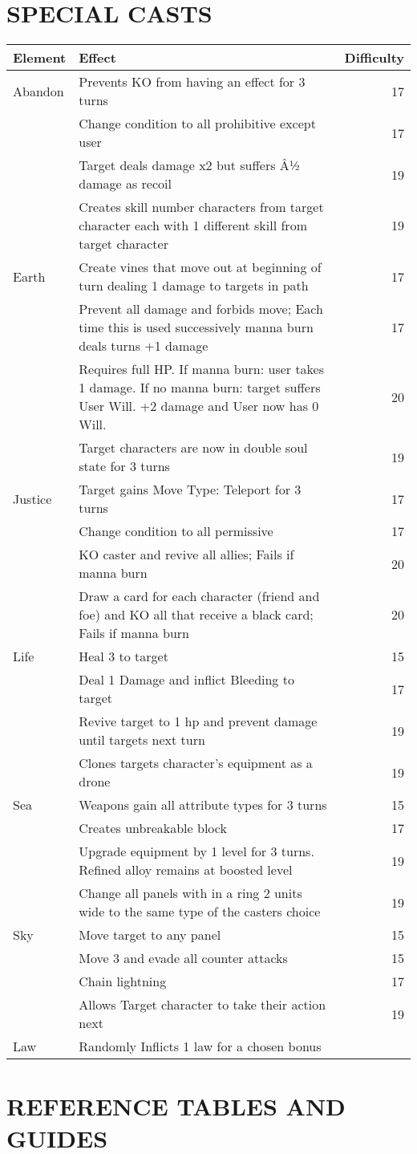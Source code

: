 \section{SPECIAL CASTS}

\begin{tabularx}{\textwidth}{l X r}

\hline
Element & Effect & Difficulty \\
\hline
Abandon & Prevents KO from having an effect for 3 turns & 17 \\
  &Change condition to all prohibitive except user & 17\\
  & Target deals damage x2 but suffers Â½ damage as recoil & 19\\
  &Creates skill number characters from target character each with 1 different skill from target character & 19 \\
Earth & Create vines that move out at beginning of turn dealing 1 damage to targets in path & 17 \\
  & Prevent all damage and forbids move; Each time this is used successively manna burn deals turns +1 damage & 17 \\
  & Requires full HP\@.  If manna burn: user takes 1 damage. If no manna burn: target suffers User Will. +2 damage and User now has 0 Will. & 20\\
  & Target characters are now in double soul state for 3 turns & 19 \\
Justice & Target gains Move Type: Teleport for 3 turns & 17\\
  &Change condition to all permissive & 17\\
  &KO caster and revive all allies; Fails if manna burn& 20\\
  &Draw a card for each character (friend and foe) and KO all that receive a black card; Fails if manna burn & 20\\
Life & Heal 3 to target& 15\\
  & Deal 1 Damage and inflict Bleeding to target & 17\\
  &Revive target to 1 hp and prevent damage until targets next turn & 19\\
  &Clones targets character's equipment as a drone & 19\\
Sea & Weapons gain all attribute types for 3 turns & 15\\
  & Creates unbreakable block & 17 \\
  & Upgrade equipment by 1 level for 3 turns.  Refined alloy remains at boosted level & 19\\
  & Change all panels with in a ring 2 units wide to the same type of the casters choice & 19\\
Sky & Move target to any panel & 15\\
  & Move 3 and evade all counter attacks & 15\\
  & Chain lightning & 17\\
  & Allows Target character to take their action next & 19\\
Law & Randomly Inflicts 1 law for a chosen bonus & \\

\end{tabularx}

\section{REFERENCE TABLES AND GUIDES}
